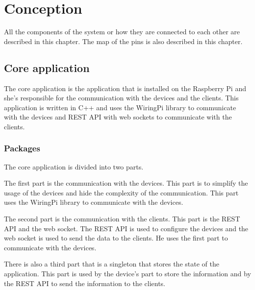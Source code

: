 \chapter{Conception}
\label{ch:conception}

All the components of the system or how they are connected to each other are described in this chapter.
The map of the pins is also described in this chapter.

\section{Core application}
\label{conception:core-application}

The core application is the application that is installed on the Raspberry Pi and she's responsible for the communication with the devices and the clients.
This application is written in C++ and uses the WiringPi library to communicate with the devices and REST API with web sockets to communicate with the clients.

\subsection{Packages}
\label{conception:core-application:packages}

The core application is divided into two parts.

The first part is the communication with the devices.
This part is to simplify the usage of the devices and hide the complexity of the communication.
This part uses the WiringPi library to communicate with the devices.

The second part is the communication with the clients.
This part is the REST API and the web socket.
The REST API is used to configure the devices and the web socket is used to send the data to the clients.
He uses the first part to communicate with the devices.

There is also a third part that is a singleton that stores the state of the application.
This part is used by the device’s part to store the information and by the REST API to send the information to the clients.

